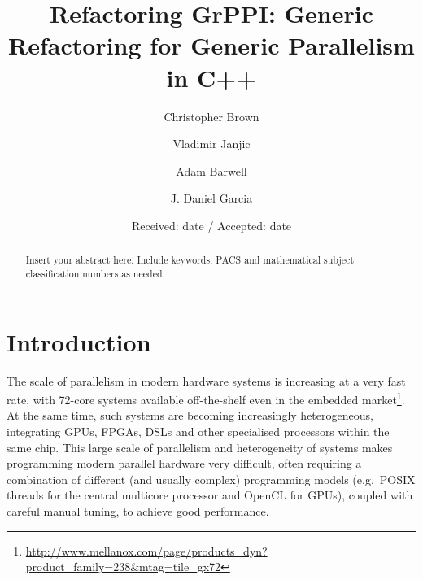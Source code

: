 \title{Refactoring GrPPI: Generic Refactoring for Generic Parallelism in C++}%



\author{Christopher Brown         \and
        Vladimir Janjic \and 
        Adam Barwell \and
        J. Daniel Garcia
}



\date{Received: date / Accepted: date}


\maketitle

\begin{abstract}
Insert your abstract here. Include keywords, PACS and mathematical
subject classification numbers as needed.
\end{abstract}

\section{Introduction}
\label{intro}

\noindent
The scale of parallelism in modern hardware systems is increasing at a very fast rate, with 72-core systems available off-the-shelf even in the embedded market\footnote{\url{http://www.mellanox.com/page/products_dyn?product_family=238&mtag=tile_gx72}}. At the same time, such systems are becoming increasingly heterogeneous, integrating GPUs, FPGAs, DSLs and other specialised processors within the same chip. This large scale of parallelism and heterogeneity of systems makes programming modern parallel hardware very difficult, often requiring a combination of different (and usually complex) programming models (e.g.~POSIX threads for the central multicore processor and OpenCL for GPUs), coupled with careful manual tuning, to achieve good performance. 

